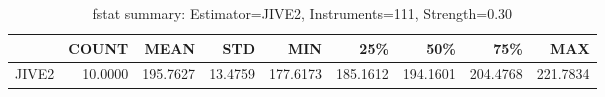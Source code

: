 \begin{table}[ht]
\centering
\caption{fstat summary: Estimator=JIVE2, Instruments=111, Strength=0.30}
\begin{tabular}{lrrrrrrrr}
\toprule
 & COUNT & MEAN & STD & MIN & 25\% & 50\% & 75\% & MAX \\
\midrule
JIVE2 & 10.0000 & 195.7627 & 13.4759 & 177.6173 & 185.1612 & 194.1601 & 204.4768 & 221.7834 \\
\bottomrule
\end{tabular}
\end{table}
